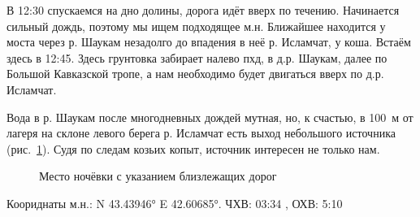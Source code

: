 В 12:30 спускаемся на дно долины, дорога идёт вверх по течению. Начинается сильный дождь, поэтому мы ищем подходящее м.н. Ближайшее находится у моста через р. Шаукам незадолго до впадения в неё р. Исламчат, у коша. Встаём здесь в 12:45. Здесь грунтовка забирает налево пхд, в д.р. Шаукам, далее по Большой Кавказской тропе, а нам необходимо будет двигаться вверх по д.р. Исламчат.

Вода в р. Шаукам после многодневных дождей мутная, но, к счастью, в 100~м от лагеря на склоне левого берега р. Исламчат есть выход небольшого источника (рис.~\ref{fig:mn910}). Судя по следам козьих копыт, источник интересен не только нам.

\begin{figure}[h!]
	\centering
	\caption{Место ночёвки с указанием близлежащих дорог}
	\label{fig:mn910}
\end{figure}

Коориднаты м.н.: N 43.43946° E 42.60685°. ЧХВ: 03:34 , ОХВ: 5:10
\clearpage
